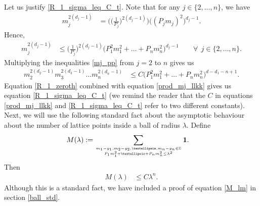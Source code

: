 \documentclass[11pt,lettersize,reqno,fullpage]{amsart}
\begin{document}
Let us 
justify 
\eqref{R_1_sigma_leq_C_t}.  
Note that for any $j \in \{2, \ldots, n\}$, we have 
\begin{align*} 
m_j^{2(d_j-1)}&= \Big(\Big(\frac{1}{P_j}\Big)^{2(d_j-1)}\Big) 
\Big((P_j m_j)^{2}\Big)^{d_j-1}. 
\end{align*} 
Hence, 
\begin{align} 
m_j^{2(d_j-1)}&\leq \Big(\frac{1}{P_j}\Big)^{2(d_j-1)} \Big(P_1^2m_1^2+ \ldots + P_n m_n^2\Big)^{d_j-1}  
 \qquad \forall~~j \in \{2, \ldots, n\}. \label{mj_pp}
\end{align}
Multiplying the inequalities \eqref{mj_pp} from $j=2$ to $n$ gives us 
\begin{align} 
m_2^{2(d_2-1)}m_3^{2(d_3-1)} \ldots m_n^{2(d_n-1)} &\leq C   
\Big(P_1^2m_1^2+ \ldots + P_n m_n^2\Big)^{d-d_1-n+1}. 
\label{prod_mj_llkk} 
\end{align}
Equation \eqref{R_1_zeroth} combined with 
equation \eqref{prod_mj_llkk} gives us 
equation \eqref{R_1_sigma_leq_C_t} 
(we remind the reader that the $C$ in equations \eqref{prod_mj_llkk} and \eqref{R_1_sigma_leq_C_t} 
refer to two different constants). 
Next, we will use the following standard fact about the asymptotic behaviour about the 
number of lattice points inside a ball of radius $\lambda$. 
Define  
\begin{align} 
M(\lambda)&:=  
\sum_{{m_1-y_1, m_2 - y_2, \ldots ,m_n-y_n \in \mathbb{Z}}\atop {P_1 m_1^2+\ldots + P_n m_n^2 \leq \lambda^2}} 
\mathbf{1}. \label{M_ball_std}
\end{align}
Then 
\begin{align} 
M(\lambda)& \leq C \lambda^n. \label{M_lm} 
\end{align}
Although this is a standard fact, we have included a proof of 
equation \eqref{M_lm} in section \ref{ball_std}. 
\end{document}
